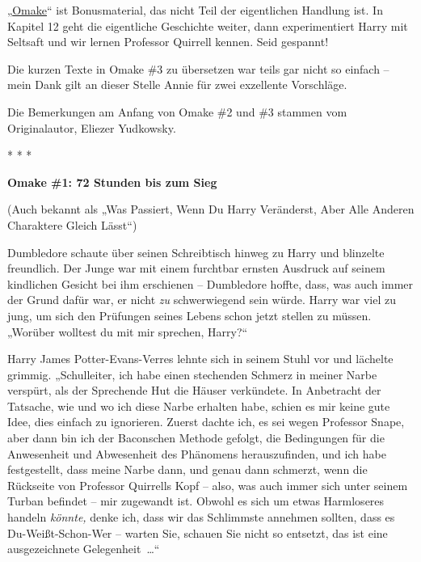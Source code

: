 

\hypertarget{omake-1-2-und-3}{%

„\href{http://www.\%20urbandictionary.\%20com/define.\%20php?term=omake\&\%20defid=27860“\%20target=}{Omake}“ ist Bonusmaterial, das nicht Teil der eigentlichen Handlung ist. In Kapitel 12 geht die eigentliche Geschichte weiter, dann experimentiert Harry mit Seltsaft und wir lernen Professor Quirrell kennen. Seid gespannt!

Die kurzen Texte in Omake \#3 zu übersetzen war teils gar nicht so einfach -- mein Dank gilt an dieser Stelle Annie für zwei exzellente Vorschläge.

Die Bemerkungen am Anfang von Omake \#2 und \#3 stammen vom Originalautor, Eliezer Yudkowsky.

* * *

\textbf{Omake \#1: 72 Stunden bis zum Sieg}

(Auch bekannt als „Was Passiert, Wenn Du Harry Veränderst, Aber Alle Anderen Charaktere Gleich Lässt“)

Dumbledore schaute über seinen Schreibtisch hinweg zu Harry und blinzelte freundlich. Der Junge war mit einem furchtbar ernsten Ausdruck auf seinem kindlichen Gesicht bei ihm erschienen -- Dumbledore hoffte, dass, was auch immer der Grund dafür war, er nicht \emph{zu} schwerwiegend sein würde. Harry war viel zu jung, um sich den Prüfungen seines Lebens schon jetzt stellen zu müssen. „Worüber wolltest du mit mir sprechen, Harry?“

Harry James Potter-Evans-Verres lehnte sich in seinem Stuhl vor und lächelte grimmig. „Schulleiter, ich habe einen stechenden Schmerz in meiner Narbe verspürt, als der Sprechende Hut die Häuser verkündete. In Anbetracht der Tatsache, wie und wo ich diese Narbe erhalten habe, schien es mir keine gute Idee, dies einfach zu ignorieren. Zuerst dachte ich, es sei wegen Professor Snape, aber dann bin ich der Baconschen Methode gefolgt, die Bedingungen für die Anwesenheit und Abwesenheit des Phänomens herauszufinden, und ich habe festgestellt, dass meine Narbe dann, und genau dann schmerzt, wenn die Rückseite von Professor Quirrells Kopf -- also, was auch immer sich unter seinem Turban befindet -- mir zugewandt ist. Obwohl es sich um etwas Harmloseres handeln \emph{könnte,} denke ich, dass wir das Schlimmste annehmen sollten, dass es Du-Weißt-Schon-Wer -- warten Sie, schauen Sie nicht so entsetzt, das ist eine ausgezeichnete Gelegenheit~…“

}
